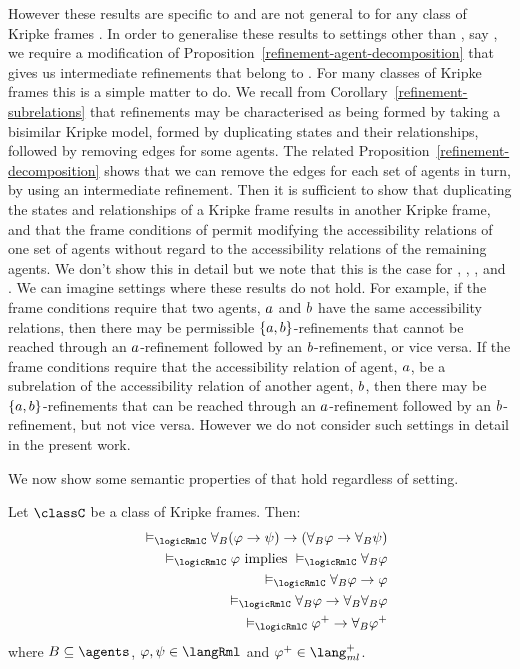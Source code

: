 However these results are specific to \logicRmlK{} and are not general to \logicRmlC{} for any class of Kripke frames \classC{}.
In order to generalise these results to settings other than \classK{}, say \classC{}, we require a modification of Proposition~\ref{refinement-agent-decomposition} that gives us intermediate refinements that belong to \classC{}.
For many classes of Kripke frames this is a simple matter to do.
We recall from Corollary~\ref{refinement-subrelations} that refinements may be characterised as being formed by taking a bisimilar Kripke model, formed by duplicating states and their relationships, followed by removing edges for some agents.
The related Proposition~\ref{refinement-decomposition} shows that we can remove the edges for each set of agents in turn, by using an intermediate refinement.
Then it is sufficient to show that duplicating the states and relationships of a \classC{} Kripke frame results in another \classC{} Kripke frame, and that the frame conditions of \classC{} permit modifying the accessibility relations of one set of agents without regard to the accessibility relations of the remaining agents.
We don't show this in detail but we note that this is the case for \classK{}, \classKF{}, \classKFF{}, \classKD{} and \classS{}.
We can imagine settings where these results do not hold.
For example, if the frame conditions require that two agents, $a$ and $b$ have the same accessibility relations, then there may be permissible $\{a, b\}$-refinements that cannot be reached through an $a$-refinement followed by an $b$-refinement, or vice versa.
If the frame conditions require that the accessibility relation of agent, $a$, be a subrelation of the accessibility relation of another agent, $b$, then there may be $\{a, b\}$-refinements that can be reached through an $a$-refinement followed by an $b$-refinement, but not vice versa.
However we do not consider such settings in detail in the present work.

We now show some semantic properties of \logicRml{} that hold regardless of setting.

\begin{proposition}\label{rml-validities}
Let $\classC$ be a class of Kripke frames. Then:
\begin{eqnarray}
    &&\entails_\logicRmlC \allrefsBs (\phi \implies \psi) \implies (\allrefsBs \phi \implies \allrefsBs \psi) \label{rml-validity-r}\\
    &&\entails_\logicRmlC \phi \text{ implies } \entails_\logicRmlC \allrefsBs \phi \label{rml-validity-necr}\\
    &&\entails_\logicRmlC \allrefsBs \phi \implies \phi \label{rml-validity-rt}\\
    &&\entails_\logicRmlC \allrefsBs \phi \implies \allrefsBs \allrefsBs \phi \label{rml-validity-r4}\\
    &&\entails_\logicRmlC \phi^+ \implies \allrefsBs \phi^+ \label{rml-validity-rp}
\end{eqnarray}
where $\agentsB \subseteq \agents$, $\phi, \psi \in \langRml$ and $\phi^+ \in \langMlPlus$.
\end{proposition}

